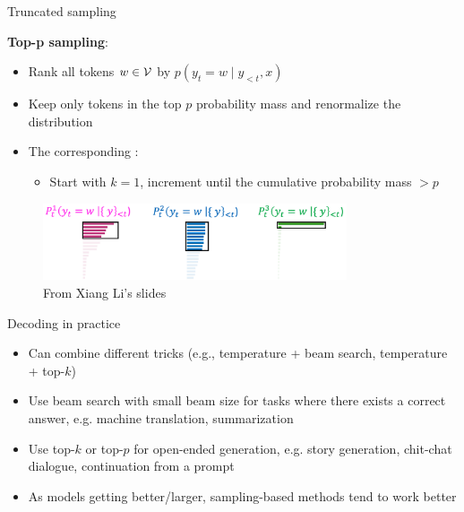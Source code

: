 \documentclass[usenames,dvipsnames,notes,11pt,aspectratio=169,hyperref={colorlinks=true, linkcolor=blue}]{beamer}
\begin{document}
\begin{frame}
    {Truncated sampling}
    
    \textbf{Top-p sampling}:\\
    \begin{itemize}
        \item Rank all tokens $w\in\mathcal{V}$ by $p(y_t=w\mid y_{<t},x)$
        \item Keep only tokens in the top $p$ probability mass
            and renormalize the distribution
        \item The corresponding :
            \begin{itemize}
            \item Start with $k=1$, increment until the cumulative probability mass $>p$
            \end{itemize}
    \end{itemize}
    \begin{figure}
        \includegraphics[width=0.8\textwidth]{figures/top-p}
        \caption{From Xiang Li's slides}
    \end{figure}
\end{frame}

\begin{frame}
    {Decoding in practice}
    \begin{itemize}
        \itemsep1em
        \item Can combine different tricks (e.g., temperature + beam search, temperature + top-$k$)
        \item Use beam search with small beam size for tasks where there exists a correct answer, e.g. machine translation, summarization
        \item Use top-$k$ or top-$p$ for open-ended generation, e.g. story generation, chit-chat dialogue, continuation from a prompt
        \item As models getting better/larger, sampling-based methods tend to work better
    \end{itemize}
\end{frame}
\end{document}
